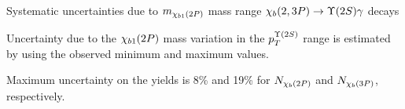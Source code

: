 \begin{frame}{Systematic uncertainties due to $m_{\chi_{b 1}(2P)}$ mass range $\chi_b(2,3P) \to \TwoS \gamma$ decays}

Uncertainty due to the $\chi_{b 1}(2P)$ mass variation in the $p_T^{\TwoS}$ range is estimated by using the observed minimum and maximum values.

\begin{center}

\end{center}
\begin{block}{}
Maximum uncertainty on the yields is 8\% and 19\% for 
$N_{\chi_{b}(2P)}$ and $N_{\chi_{b}(3P)}$, respectively.
\end{block}
\end{frame}